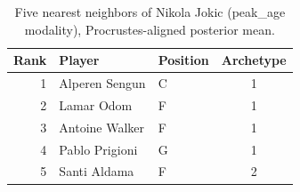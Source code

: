 \begin{table}[htbp]
  \centering\small
  \begin{tabular}{rllc}
    \toprule
    Rank & Player & Position & Archetype \\
    \midrule
    1 & Alperen Sengun & C & 1 \\
    2 & Lamar Odom & F & 1 \\
    3 & Antoine Walker & F & 1 \\
    4 & Pablo Prigioni & G & 1 \\
    5 & Santi Aldama & F & 2 \\
    \bottomrule
  \end{tabular}
  \caption{Five nearest neighbors of Nikola Jokic (peak_age modality), Procrustes-aligned posterior mean.}
  \label{tab:Nikola_Jokic_neighbors_peak_age}
\end{table}

